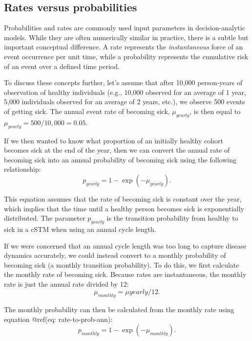 \documentclass[
]{article}
\begin{document}
\hypertarget{rates-versus-probabilities}{%
\subsection{Rates versus probabilities}\label{rates-versus-probabilities}}

Probabilities and rates are commonly used input parameters in decision-analytic models. While they are often numerically similar in practice, there is a subtle but important conceptual difference. A rate represents the \textit{instantaneous} force of an event occurrence per unit time, while a probability represents the cumulative risk of an event over a defined time period.

To discuss these concepts further, let's assume that after 10,000 person-years of observation of healthy individuals (e.g., 10,000 observed for an average of 1 year, 5,000 individuals observed for an average of 2 years, etc.), we observe 500 events of getting sick. The annual event rate of becoming sick, \(\mu_{yearly}\), is then equal to \(\mu_{yearly}=500 / 10,000=0.05\).

If we then wanted to know what proportion of an initially healthy cohort becomes sick at the end of the year, then we can convert the annual rate of becoming sick into an annual probability of becoming sick using the following relationship:
\begin{equation}
    p_{yearly} = 1-\exp{\left(-\mu_{yearly} \right)}.
    \label{eq:rate-to-prob-ann}
\end{equation}

This equation assumes that the rate of becoming sick is constant over the year, which implies that the time until a healthy person becomes sick is exponentially distributed. The parameter \(p_{yearly}\) is the transition probability from healthy to sick in a cSTM when using an annual cycle length.

If we were concerned that an annual cycle length was too long to capture disease dynamics accurately, we could instead convert to a monthly probability of becoming sick (a monthly transition probability). To do this, we first calculate the monthly rate of becoming sick. Because rates are instantaneous, the monthly rate is just the annual rate divided by 12:
\begin{equation}
    \mu_{monthly} = \mu{yearly} / 12.
    \label{eq:rate-ann-to-month}
\end{equation}

The monthly probability can then be calculated from the monthly rate using equation @ref(eq: rate-to-prob-ann):
\begin{equation}
    p_{monthly} = 1-\exp{\left(-\mu_{monthly}\right)}.
\end{equation}
\end{document}
